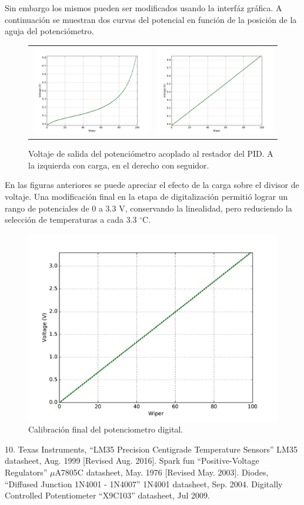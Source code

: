 \documentclass{wileysix}
\begin{document}
Sin embargo los mismos pueden ser modificados usando la interf\'az gr\'afica. A continuaci\'on se muestran dos curvas del potencial en funci\'on de la posici\'on de la aguja del potenci\'ometro.
\begin{figure}[h]
	\begin{tabular}{cc}
		\includegraphics[width=0.5\linewidth]{extras/without_follower.pdf}
		& 
		\includegraphics[width=0.5\linewidth]{extras/with_follower.pdf}
	\end{tabular}
	\caption{Voltaje de salida del potenci\'ometro acoplado al restador del PID. A la izquierda con carga, en el derecho con seguidor.}
\end{figure}

En las figuras anteriores se puede apreciar el efecto de la carga sobre el divisor de voltaje. Una modificaci\'on final en la etapa de digitalizaci\'on permiti\'o lograr un rango de potenciales de 0 a 3.3 V, conservando la linealidad, pero reduciendo la selecci\'on de temperaturas a cada 3.3 $^\circ$C.

\begin{figure}[h]
	\centering
	\includegraphics[width=0.4\linewidth]{extras/final_cal.pdf}
	\caption{Calibraci\'on final del potenciometro digital.}
\end{figure}
\begin{chapreferences}{10.}
	 Texas Instruments, ``LM35 Precision	Centigrade Temperature Sensors'' LM35 datasheet, Aug. 1999 [Revised Aug.
	2016].
	 Spark fun ``Positive-Voltage Regulators'' $\mu$A7805C datasheet, May. 1976 [Revised May. 2003].
	 Diodes, ``Diffused Junction 1N4001 - 1N4007'' 1N4001 datasheet, Sep. 2004.
	Digitally Controlled Potentiometer ``X9C103'' datasheet, Jul 2009.
\end{chapreferences}
\end{document}
